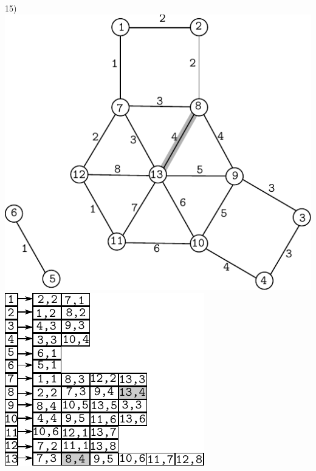 \documentclass{article}
\begin{document}
\begin{center}
15)\includegraphics[scale=0.6]{bottleneck/g15}
\hspace{5mm}
\includegraphics[scale=0.9]{bottleneck/l15}
\end{center}
\end{document}
